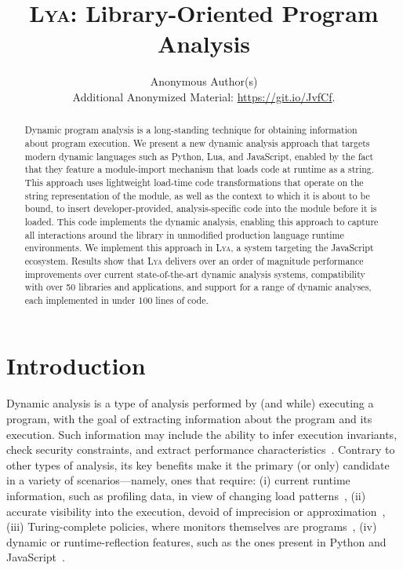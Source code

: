 \documentclass[letterpaper,twocolumn,10pt]{article}
\newcommand{\sys}{{\scshape Lya}\xspace}
\begin{document}

\date{}

\title{\Large \bf \sys: Library-Oriented Program Analysis}

\author{
{\rm Anonymous Author(s)}\\
\normalsize{Additional Anonymized Material: \href{https://git.io/JvfCf}{https://git.io/JvfCf}.}
}

\maketitle

\begin{abstract}

Dynamic program analysis is a long-standing technique for obtaining information about program execution.
We present a new dynamic analysis approach that targets modern dynamic languages such as Python, Lua, and JavaScript, enabled by the fact that they feature a module-import mechanism that loads code at runtime as a string.
This approach uses lightweight load-time code transformations that operate on the string representation of the module, as well as the context to which it is about to be bound, to insert developer-provided, analysis-specific code into the module before it is loaded.
This code implements the dynamic analysis, enabling this approach to capture all interactions around the library in unmodified production language runtime environments.
We implement this approach in \sys, a system targeting the JavaScript ecosystem. 
Results show that \sys delivers over an order of magnitude performance improvements over current state-of-the-art dynamic analysis systems, compatibility with over 50 libraries and applications, and support for a range of dynamic analyses, each implemented in under 100 lines of code.
\end{abstract}

\section{Introduction}
\label{intro}

Dynamic analysis is a type of analysis performed by (and while) executing a program, with the goal of extracting information about the program and its execution.
Such information may include the ability to infer execution invariants, check security constraints, and extract performance characteristics~\cite{analysis:10}.
Contrary to other types of analysis, its key benefits make it the primary (or only) candidate in a variety of scenarios---namely, ones that require:
  (i) current runtime information, such as profiling data, in view of changing load patterns~\cite{staticdynamic},
  (ii) accurate visibility into the execution, devoid of imprecision or approximation~\cite{staticdynamic},
  (iii) Turing-complete policies, where monitors themselves are programs~\cite{contracts1, contracts2, contracts3},
  (iv) dynamic or runtime-reflection features, such as the ones present in Python and JavaScript~\cite{jsanalysis1, jsanalysis2}.
\end{document}
